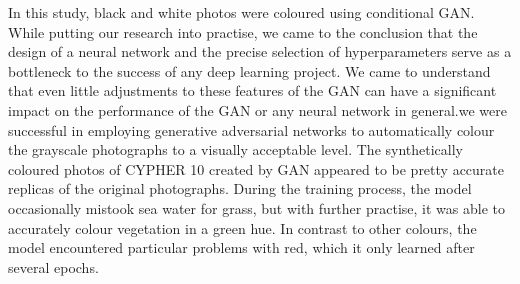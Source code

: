 \documentclass[conference]{IEEEtran}
\begin{document}
In this study, black and white photos were coloured using conditional GAN. While putting our research into practise, we came to the conclusion that the design of a neural network and the precise selection of hyperparameters serve as a bottleneck to the success of any deep learning project. We came to understand that even little adjustments to these features of the GAN can have a significant impact on the performance of the GAN or any neural network in general.we were successful in employing generative adversarial networks to automatically colour the grayscale photographs to a visually acceptable level. The synthetically coloured photos of CYPHER 10 created by GAN appeared to be pretty accurate replicas of the original photographs. During the training process, the model occasionally mistook sea water for grass, but with further practise, it was able to accurately colour vegetation in a green hue. In contrast to other colours, the model encountered particular problems with red, which it only learned after several epochs.
\end{document}
